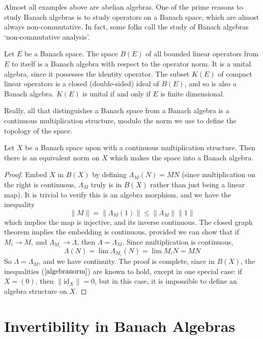 Almost all examples above are abelian algebras. One of the prime reasons to study Banach algebras is to study operators on a Banach space, which are almost always non-commutative. In fact, some folks call the study of Banach algebras `non-commutative analysis'.

\begin{example}
    Let $E$ be a Banach space. The space $B(E)$ of all bounded linear operators from $E$ to itself is a Banach algebra with respect to the operator norm. It is a unital algebra, since it possesses the identity operator. The subset $K(E)$ of compact linear operators is a closed (double-sided) ideal of $B(E)$, and so is also a Banach algebra. $K(E)$ is unital if and only if $E$ is finite dimensional.
\end{example}

Really, all that distinguishes a Banach space from a Banach algebra is a continuous multiplication structure, modulo the norm we use to define the topology of the space.

\begin{prop}
    Let $X$ be a Banach space upon with a continuous multiplication structure. Then there is an equivalent norm on $X$ which makes the space into a Banach algebra.
\end{prop}
\begin{proof}
    Embed $X$ in $B(X)$ by defining $\Lambda_M(N) = MN$ (since multiplication on the right is continuous, $\Lambda_M$ truly is in $B(X)$ rather than just being a linear map). It is trivial to verify this is an algebra morphism, and we have the inequality
    \begin{equation} \label{embedinequality} \| M \| = \| \Lambda_M (1) \| \leq \| \Lambda_M \| \| 1 \| \end{equation}
    which implies the map is injective, and its inverse continuous. The closed graph theorem implies the embedding is continuous, provided we can show that if $M_i \to M$, and $\Lambda_{M_i} \to \Lambda$, then $\Lambda = \Lambda_M$. Since multiplication is continuous,
    \[ \Lambda(N) = \lim \Lambda_{M_i}(N) = \lim M_iN = MN \]
    So $\Lambda = \Lambda_M$, and we have continuity. The proof is complete, since in $B(X)$, the inequalities ($\ref{algebranorm}$) are known to hold, except in one special case: if $X = (0)$, then $\| \text{id}_X \| = 0$, but in this case, it is impossible to define an algebra structure on $X$.
\end{proof}

\section{Invertibility in Banach Algebras}


